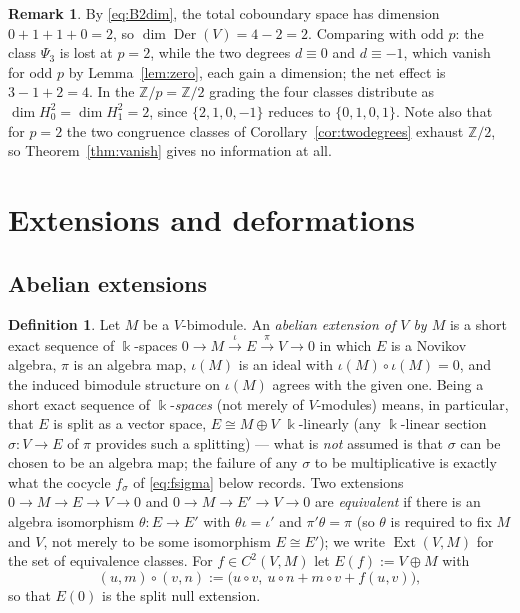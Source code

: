 \documentclass[11pt,reqno]{amsart}
\theoremstyle{plain}
\theoremstyle{definition}
\newtheorem{definition}[theorem]{Definition}
\newtheorem{remark}[theorem]{Remark}
\DeclareMathOperator{\Der}{Der}
\DeclareMathOperator{\Ext}{Ext}
\newcommand{\kk}{\Bbbk}
\newcommand{\Ht}{H^2}
\newcommand{\Zp}{\mathbb{Z}/p}
\begin{document}
\begin{remark}
By \eqref{eq:B2dim}, the total coboundary space has dimension $0+1+1+0=2$, so
$\dim\Der(V)=4-2=2$. Comparing with odd $p$: the class $\Psi_3$ is lost at $p=2$, while the
two degrees $d\equiv0$ and $d\equiv-1$, which vanish for odd $p$ by Lemma~\ref{lem:zero},
each gain a dimension; the net effect is $3-1+2=4$. In the $\Zp=\mathbb{Z}/2$ grading the
four classes distribute as $\dim\Ht_0=\dim\Ht_1=2$, since $\{2,1,0,-1\}$ reduces to
$\{0,1,0,1\}$. Note also that for $p=2$ the two congruence classes of
Corollary~\ref{cor:twodegrees} exhaust $\mathbb{Z}/2$, so Theorem~\ref{thm:vanish} gives no
information at all.
\end{remark}

\section{Extensions and deformations}\label{sec:ext}

\subsection{Abelian extensions}

\begin{definition}\label{def:ext}
Let $M$ be a $V$-bimodule. An \emph{abelian extension of $V$ by $M$} is a short exact
sequence of $\kk$-spaces
$0\to M\xrightarrow{\iota}E\xrightarrow{\pi}V\to0$ in which $E$ is a Novikov algebra, $\pi$
is an algebra map, $\iota(M)$ is an ideal with $\iota(M)\circ\iota(M)=0$, and the induced
bimodule structure on $\iota(M)$ agrees with the given one. Being a short exact sequence of
$\kk$-\emph{spaces} (not merely of $V$-modules) means, in particular, that $E$ is split as a
vector space, $E\cong M\oplus V$ $\kk$-linearly (any $\kk$-linear section
$\sigma:V\to E$ of $\pi$ provides such a splitting) --- what is \emph{not} assumed is that
$\sigma$ can be chosen to be an algebra map; the failure of any $\sigma$ to be multiplicative
is exactly what the cocycle $f_\sigma$ of \eqref{eq:fsigma} below records. Two extensions
$0\to M\to E\to V\to0$ and $0\to M\to E'\to V\to0$ are \emph{equivalent} if there is an
algebra isomorphism $\theta:E\to E'$ with $\theta\iota=\iota'$ and $\pi'\theta=\pi$ (so
$\theta$ is required to fix $M$ and $V$, not merely to be some isomorphism $E\cong E'$); we
write $\Ext(V,M)$ for the set of equivalence classes. For $f\in C^2(V,M)$ let
$E(f):=V\oplus M$ with
\begin{equation}
(u,m)\circ(v,n):=\bigl(u\circ v,\ u\circ n+m\circ v+f(u,v)\bigr),
\label{eq:Ef}
\end{equation}
so that $E(0)$ is the split null extension.
\end{definition}
\end{document}
